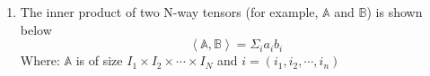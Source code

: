 \documentclass[11.5pt,a4paper]{article}
\begin{document}
\begin{itemize}
\begin{enumerate}
\begin{itemize}
            \textbf{Example:}
            
            Let
            \[
            A = \begin{bmatrix} 1 & 2 \\ 3 & 4 \end{bmatrix}, \quad B = \begin{bmatrix} 0 & 5 \\ 6 & 7 \end{bmatrix}
            \]
            The Kronecker product \( A \otimes B \) is calculated as:
            
            \[
            A \otimes B = \begin{bmatrix}
            1 \cdot B & 2 \cdot B \\
            3 \cdot B & 4 \cdot B
            \end{bmatrix}
            = \begin{bmatrix}
            \begin{bmatrix} 0 & 5 \\ 6 & 7 \end{bmatrix} & \begin{bmatrix} 0 & 10 \\ 12 & 14 \end{bmatrix} \\
            \begin{bmatrix} 0 & 5 \\ 6 & 7 \end{bmatrix} \cdot 3 & \begin{bmatrix} 0 & 5 \\ 6 & 7 \end{bmatrix} \cdot 4
            \end{bmatrix}
            = \begin{bmatrix}
            0 & 5 & 0 & 10 \\
            6 & 7 & 12 & 14 \\
            0 & 15 & 0 & 20 \\
            18 & 21 & 24 & 28
            \end{bmatrix}
            \]
        \end{itemize}
        
        \item The inner product of two N-way tensors (for example, $\mathbb{A}$ and $\mathbb{B}$) is shown below
        \begin{equation*}
            \left < \mathbb{A}, \mathbb{B}\right> = \Sigma_i a_ib_i
        \end{equation*}
        Where: $\mathbb{A}$ is of size $I_1\times I_2 \times \cdots \times I_N$ and $i = (i_1, i_2, \cdots, i_n)$


\end{enumerate}
\end{itemize}
\end{document}

